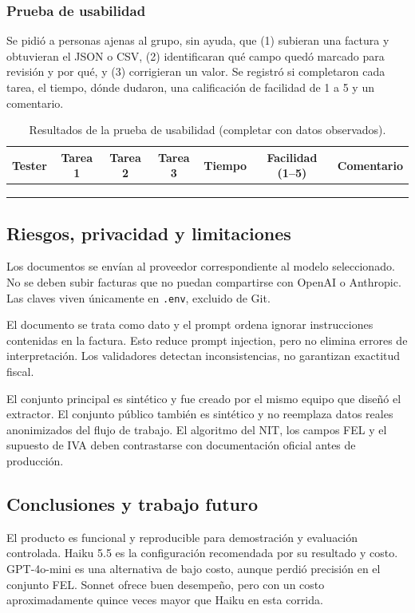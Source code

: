 \documentclass[11pt,a4paper]{article}
\begin{document}
\subsubsection{Prueba de usabilidad}
Se pidió a personas ajenas al grupo, sin ayuda, que (1) subieran una factura y obtuvieran el JSON o CSV, (2) identificaran qué campo quedó marcado para revisión y por qué, y (3) corrigieran un valor. Se registró si completaron cada tarea, el tiempo, dónde dudaron, una calificación de facilidad de 1 a 5 y un comentario.

\begin{table}[ht]
\centering
\caption{Resultados de la prueba de usabilidad (completar con datos observados).}
\begin{tabular}{lcccccc}
\toprule
Tester & Tarea 1 & Tarea 2 & Tarea 3 & Tiempo & Facilidad (1--5) & Comentario \\
\midrule
 &  &  &  &  &  &  \\
 &  &  &  &  &  &  \\
 &  &  &  &  &  &  \\
\bottomrule
\end{tabular}
\end{table}

\subsection{Riesgos, privacidad y limitaciones}
Los documentos se envían al proveedor correspondiente al modelo seleccionado. No se deben subir facturas que no puedan compartirse con OpenAI o Anthropic. Las claves viven únicamente en \texttt{.env}, excluido de Git.

El documento se trata como dato y el prompt ordena ignorar instrucciones contenidas en la factura. Esto reduce prompt injection, pero no elimina errores de interpretación. Los validadores detectan inconsistencias, no garantizan exactitud fiscal.

El conjunto principal es sintético y fue creado por el mismo equipo que diseñó el extractor. El conjunto público también es sintético y no reemplaza datos reales anonimizados del flujo de trabajo. El algoritmo del NIT, los campos FEL y el supuesto de IVA deben contrastarse con documentación oficial antes de producción.

\subsection{Conclusiones y trabajo futuro}
El producto es funcional y reproducible para demostración y evaluación controlada. Haiku 5.5 es la configuración recomendada por su resultado y costo. GPT-4o-mini es una alternativa de bajo costo, aunque perdió precisión en el conjunto FEL. Sonnet ofrece buen desempeño, pero con un costo aproximadamente quince veces mayor que Haiku en esta corrida.
\end{document}
